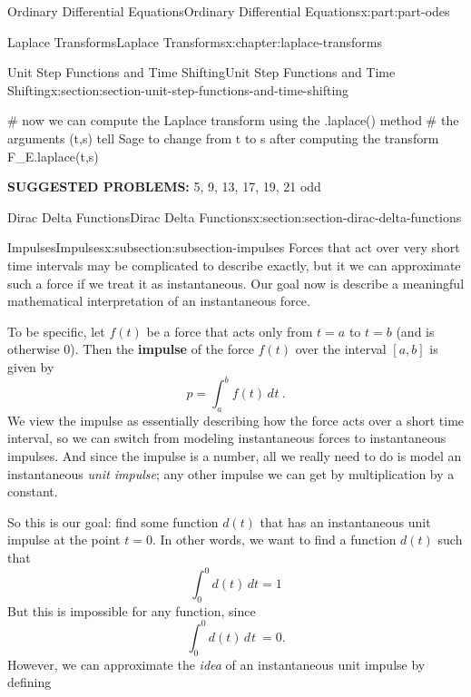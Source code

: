 \documentclass[twoside,10pt,]{book}
\newcommand{\terminology}[1]{\textbf{#1}}
\numberwithin{equation}{part}
\providecommand{\dd}[2][]{\, d^{#1} #2\ }
\newcommand{\Int}[2]{\int_{#1}^{#2}}
\begin{document}
\begin{partptx}{Ordinary Differential Equations}{}{Ordinary Differential Equations}{}{}{x:part:part-odes}
\begin{chapterptx}{Laplace Transforms}{}{Laplace Transforms}{}{}{x:chapter:laplace-transforms}
\begin{sectionptx}{Unit Step Functions and Time Shifting}{}{Unit Step Functions and Time Shifting}{}{}{x:section:section-unit-step-functions-and-time-shifting}
\begin{sageinput}
# now we can compute the Laplace transform using the .laplace() method
# the arguments (t,s) tell Sage to change from t to s after computing the transform
F_E.laplace(t,s)
\end{sageinput}
\terminology{SUGGESTED PROBLEMS:} 5, 9, 13, 17, 19, 21 odd\end{sectionptx}
%
%
\typeout{************************************************}
\typeout{************************************************}
%
\begin{sectionptx}{Dirac Delta Functions}{}{Dirac Delta Functions}{}{}{x:section:section-dirac-delta-functions}
%
%
\typeout{************************************************}
\typeout{************************************************}
%
\begin{subsectionptx}{Impulses}{}{Impulses}{}{}{x:subsection:subsection-impulses}
Forces that act over very short time intervals may be complicated to describe exactly, but it we can approximate such a force if we treat it as instantaneous. Our goal now is describe a meaningful mathematical interpretation of an instantaneous force.%
\par
To be specific, let \(f(t)\) be a force that acts only from \(t=a\) to \(t=b\) (and is otherwise \(0\)). Then the \terminology{impulse} of the force \(f(t)\) over the interval \([a,b]\) is given by%
\begin{equation*}
p = \Int{a}{b}f(t)\dd{t}.
\end{equation*}
We view the impulse as essentially describing how the force acts over a short time interval, so we can switch from modeling instantaneous forces to instantaneous impulses. And since the impulse is a number, all we really need to do is model an instantaneous \emph{unit impulse}; any other impulse we can get by multiplication by a constant.%
\par
So this is our goal: find some function \(d(t)\) that has an instantaneous unit impulse at the point \(t=0\). In other words, we want to find a function \(d(t)\) such that%
\begin{equation*}
\int_{0}^{0}d(t)\,dt = 1
\end{equation*}
But this is impossible for any function, since%
\begin{equation*}
\Int{0}{0}d(t)\dd{t} = 0.
\end{equation*}
However, we can approximate the \emph{idea} of an instantaneous unit impulse by defining%
\begin{equation*}

\end{equation*}
\end{subsectionptx}
\end{sectionptx}
\end{chapterptx}
\end{partptx}
\end{document}
